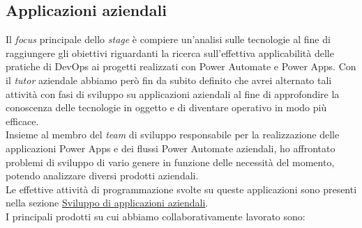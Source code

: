 \subsection{Applicazioni aziendali}
Il \emph{focus} principale dello \emph{stage} è compiere un'analisi sulle tecnologie al fine di raggiungere gli obiettivi riguardanti la ricerca sull'effettiva applicabilità delle pratiche di \gls{DevOps} ai progetti realizzati con Power Automate e Power Apps.
Con il \emph{tutor} aziendale abbiamo però fin da subito definito che avrei alternato tali attività con fasi di sviluppo su applicazioni aziendali al fine di approfondire la conoscenza delle tecnologie in oggetto e di diventare operativo in modo più efficace.\\
Insieme al membro del \emph{team} di sviluppo responsabile per la realizzazione delle applicazioni Power Apps e dei flussi Power Automate aziendali, ho affrontato problemi di sviluppo di vario genere in funzione delle necessità del momento, potendo analizzare diversi prodotti aziendali.\\
Le effettive attività di programmazione svolte su queste applicazioni sono presenti nella sezione \hyperref[sviluppoApplicazioni]{Sviluppo di applicazioni aziendali}.\\
I principali prodotti su cui abbiamo collaborativamente lavorato sono:
